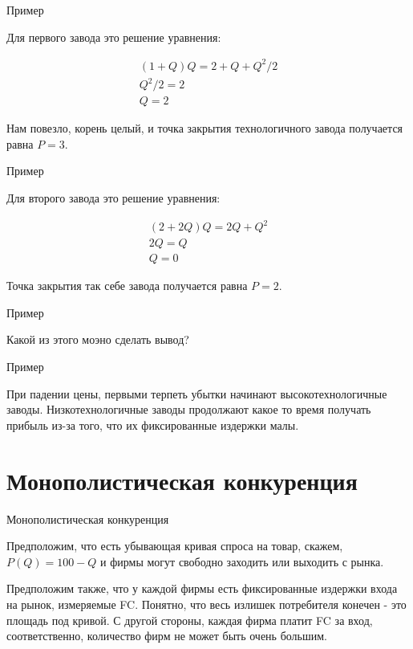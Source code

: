 \documentclass{beamer}
\begin{document}
\begin{frame}{Пример}
	
Для первого завода это решение уравнения:

\begin{gather*}
(1+Q) Q = 2 + Q + Q^2/2 \\
Q^2/2 = 2\\
Q = 2
\end{gather*}

Нам повезло, корень целый, и точка закрытия технологичного завода получается равна $P=3$. 
	
\end{frame}

\begin{frame}{Пример}

Для второго завода это решение уравнения:

\begin{gather*}
(2+2Q) Q = 2Q + Q^2 \\
2Q = Q\\
Q = 0
\end{gather*}

Точка закрытия так себе завода получается равна $P=2$.
	
\end{frame}

\begin{frame}{Пример}

Какой из этого моэно сделать вывод?
	
\end{frame}

\begin{frame}{Пример}

При падении цены, первыми терпеть убытки начинают высокотехнологичные заводы. Низкотехнологичные заводы продолжают какое то время получать прибыль из-за того, что их фиксированные издержки малы.
	
\end{frame}

\section{Монополистическая конкуренция}

\begin{frame}{Монополистическая конкуренция}

Предположим, что есть убывающая кривая спроса на товар, скажем, $P(Q) = 100 - Q$ и фирмы могут свободно заходить или выходить с рынка. 

Предположим также, что у каждой фирмы есть фиксированные издержки входа на рынок, измеряемые FC. Понятно, что весь излишек потребителя конечен - это площадь под кривой. С другой стороны, каждая фирма платит FC за вход, соответственно, количество фирм не может быть очень большим.
	
\end{frame}
\end{document}
